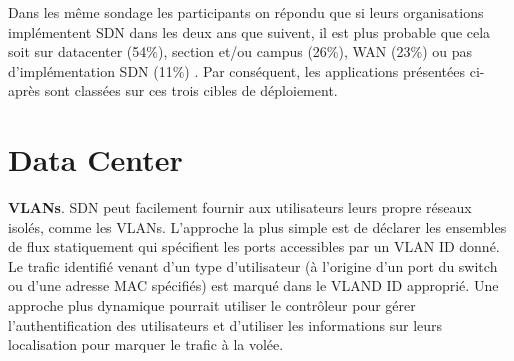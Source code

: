 Dans les même sondage les participants on répondu que si leurs organisations implémentent SDN dans les deux ans que suivent, il est plus probable que cela soit sur \gls{datacenter} (54\%), section et/ou campus (26\%), WAN (23\%) ou pas d'implémentation SDN (11\%) \cite{2013GuideSDNNVTable12}. Par conséquent, les applications présentées ci-après sont classées sur ces trois cibles de déploiement.




\section{Data Center}

\textbf{VLANs}. SDN peut facilement fournir aux utilisateurs leurs propre réseaux isolés, comme les VLANs. L'approche la plus simple est de déclarer les ensembles de flux statiquement qui spécifient les ports accessibles par un VLAN ID donné. Le trafic identifié venant d'un type d'utilisateur (à l'origine d'un port du switch ou d'une adresse MAC spécifiés) est marqué dans le VLAND ID approprié. Une approche plus dynamique pourrait utiliser le contrôleur pour gérer l'authentification des utilisateurs et d'utiliser les informations sur leurs localisation pour marquer le trafic à la volée. \cite{OpenFlowStanfordUsing} 







